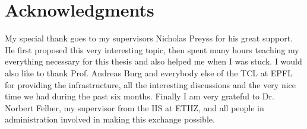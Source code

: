 \chapter*{Acknowledgments}
My special thank goes to my supervisors Nicholas Preyss for his great support.
He first proposed this very interesting topic, then spent many hours
teaching my everything necessary for this thesis and also helped me when I was
stuck.
I would also like to thank Prof. Andreas Burg and everybody else of the
\gls{TCL} at \gls{EPFL} for providing the infrastructure, all the interesting
discussions and the very nice time we had during the past six months.
Finally I am very grateful to Dr. Norbert Felber, my supervisor from the
\gls{IIS} at \gls{ETHZ}, and all people in administration involved in making
this exchange possible. \\

